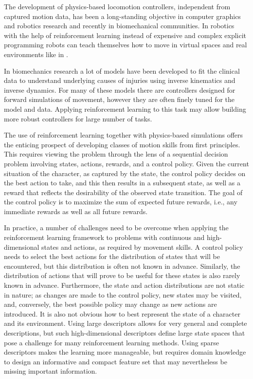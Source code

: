 
The development of physics-based locomotion controllers, independent from
captured motion data, has been a long-standing objective in computer graphics
and robotics research and recently in biomechanical communities. In robotics
with the help of reinforcement learning instead of expensive and complex
explicit programming robots can teach themselves how to move in virtual spaces
and real environments like in \cite{heess2016learning}.

In biomechanics research a lot of models have been developed to fit the
clinical data to understand underlying causes of injuries using inverse
kinematics and inverse dynamics. For many of these models there are controllers
designed for forward simulations of movement, however they are often finely
tuned for the model and data. Applying reinforcement learning to this task may
allow building more robust controllers for large number of tasks.

The use of reinforcement learning together with physics-based simulations
offers the enticing prospect of developing classes of motion skills from first
principles. This requires viewing the problem through the lens of a sequential
decision problem involving states, actions, rewards, and a control policy.
Given the current situation of the character, as captured by the state, the
control policy decides on the best action to take, and this then results in a
subsequent state, as well as a reward that reflects the desirability of the
observed state transition. The goal of the control policy is to maximize the
sum of expected future rewards, i.e., any immediate rewards as well as all
future rewards.

In practice, a number of challenges need to be overcome when applying the
reinforcement learning framework to problems with continuous and
high-dimensional states and actions, as required by movement skills. A control
policy needs to select the best actions for the distribution of states that
will be encountered, but this distribution is often not known in advance.
Similarly, the distribution of actions that will prove to be useful for these
states is also rarely known in advance. Furthermore, the state and action
distributions are not static in nature; as changes are made to the control
policy, new states may be visited, and, conversely, the best possible policy
may change as new actions are introduced. It is also not obvious how to best
represent the state of a character and its environment. Using large descriptors
allows for very general and complete descriptions, but such high-dimensional
descriptors define large state spaces that pose a challenge for many
reinforcement learning methods. Using sparse descriptors makes the learning
more manageable, but requires domain knowledge to design an informative and
compact feature set that may nevertheless be missing important information.
